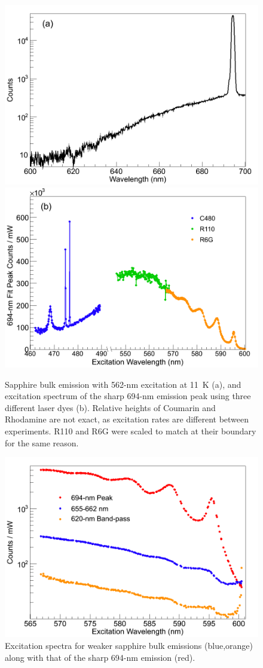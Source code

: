 \begin{figure} %
        \centering
                \includegraphics[width=.7\textwidth]{figures/Cr_a.png}
                \includegraphics[width=.7\textwidth]{figures/Cr_b.png}
                \caption{Sapphire bulk emission with 562-nm excitation at 11~K (a), and excitation spectrum of the sharp 694-nm emission peak using three different laser dyes (b).  Relative heights of Coumarin and Rhodamine are not exact, as excitation rates are different between experiments.  R110 and R6G were scaled to match at their boundary for the same reason.}
\label{fig:Cr}
\end{figure}

\begin{figure} %
        \centering
                \includegraphics[width=.7\textwidth]{figures/Cr_broad.png}
                \caption{Excitation spectra for weaker sapphire bulk emissions (blue,orange) along with that of the sharp 694-nm emission (red).}
        \label{fig:CrBroad}
\end{figure}

